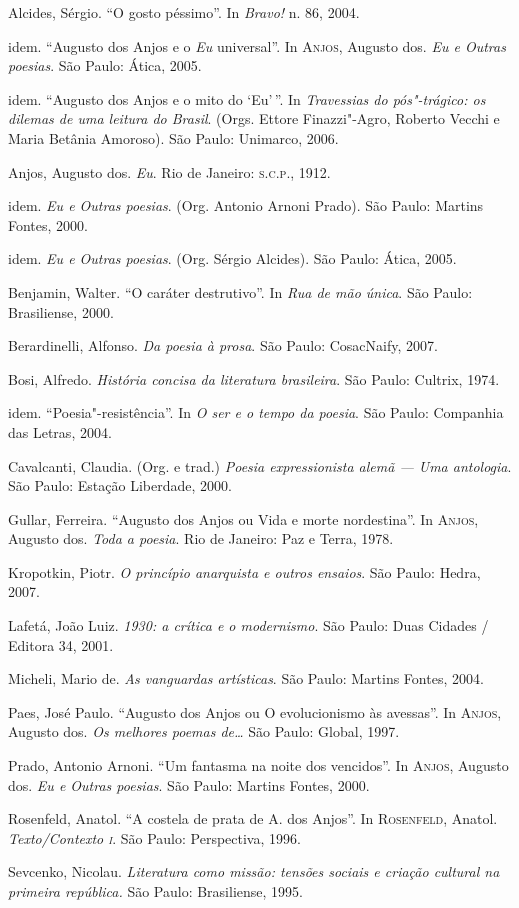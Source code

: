 \begin{bibliohedra}
Alcides, Sérgio. “O gosto péssimo”. In \textit{Bravo!} n. 86,
2004.

idem. “Augusto dos Anjos e o \textit{Eu} universal”. In
\textsc{Anjos}, Augusto dos. \textit{Eu e Outras poesias}. São Paulo:
Ática, 2005.

idem. “Augusto dos Anjos e o mito do ‘Eu’\,”. In
\textit{Travessias do pós"-trágico: os dilemas de uma leitura do
Brasil}. (Orgs. Ettore Finazzi"-Agro, Roberto Vecchi e Maria Betânia
Amoroso). São Paulo: Unimarco, 2006.

Anjos, Augusto dos. \textit{Eu}. Rio de Janeiro: \textsc{s.c.p.}, 1912.

idem. \textit{Eu e Outras poesias}. (Org. Antonio Arnoni Prado).
São Paulo: Martins Fontes, 2000. 

idem. \textit{Eu e Outras poesias}. (Org. Sérgio Alcides). São
Paulo: Ática, 2005.

Benjamin, Walter. “O caráter destrutivo”. In
\textit{Rua de mão única}. São Paulo: Brasiliense, 2000.

Berardinelli, Alfonso. \textit{Da poesia à prosa}. São Paulo:
CosacNaify, 2007.

Bosi, Alfredo. \textit{História concisa da literatura
brasileira}. São Paulo: Cultrix, 1974.

idem. “Poesia"-resistência”. In 
\textit{O ser e o tempo da poesia}. São Paulo: Companhia das Letras, 2004.

Cavalcanti, Claudia. (Org. e trad.) \textit{Poesia
expressionista alemã --- Uma antologia}. São Paulo: Estação Liberdade,
2000.

Gullar, Ferreira. “Augusto dos Anjos ou Vida e morte
nordestina”. In \textsc{Anjos}, Augusto dos. \textit{Toda a poesia}.
Rio de Janeiro: Paz e Terra, 1978.

Kropotkin, Piotr. \textit{O princípio anarquista e outros
ensaios}. São Paulo: Hedra, 2007.

Lafetá, João Luiz. \textit{1930: a crítica e o modernismo}. São
Paulo: Duas Cidades / Editora 34, 2001.

Micheli, Mario de. \textit{As vanguardas artísticas}. São
Paulo: Martins Fontes, 2004.

Paes, José Paulo. “Augusto dos Anjos ou O evolucionismo às
avessas”. In \textsc{Anjos}, Augusto dos. \textit{Os melhores poemas
de\ldots{}} São Paulo: Global, 1997.

Prado, Antonio Arnoni. “Um fantasma na noite dos vencidos”. In
\textsc{Anjos}, Augusto dos. \textit{Eu e Outras poesias}. São Paulo:
Martins Fontes, 2000.

Rosenfeld, Anatol. “A costela de prata de A. dos Anjos”. In
\textsc{Rosenfeld}, Anatol. \textit{Texto/Contexto \textsc{i}}. São Paulo:
Perspectiva, 1996.

Sevcenko, Nicolau. \textit{Literatura como missão: tensões
sociais e criação cultural na primeira república.} São Paulo:
Brasiliense, 1995.
\end{bibliohedra}


